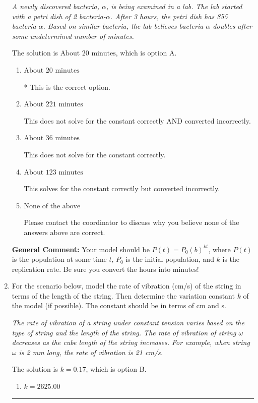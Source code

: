 \documentclass{extbook}[14pt]
\newcommand{\litem}[1]{\item #1

\rule{\textwidth}{0.4pt}}
\begin{document}
\begin{enumerate}
{\begin{center}
    \textit{ A newly discovered bacteria, $\alpha$, is being examined in a lab. The lab started with a petri dish of 2 bacteria-$\alpha$. After 3 hours, the petri dish has 855 bacteria-$\alpha$. Based on similar bacteria, the lab believes bacteria-$\alpha$ doubles after some undetermined number of minutes. }
\end{center}
The solution is \( \text{About } 20 \text{ minutes} \), which is option A.\begin{enumerate}[label=\Alph*.]
\item \( \text{About } 20 \text{ minutes} \)

* This is the correct option.
\item \( \text{About } 221 \text{ minutes} \)

This does not solve for the constant correctly AND converted incorrectly.
\item \( \text{About } 36 \text{ minutes} \)

This does not solve for the constant correctly.
\item \( \text{About } 123 \text{ minutes} \)

This solves for the constant correctly but converted incorrectly.
\item \( \text{None of the above} \)

Please contact the coordinator to discuss why you believe none of the answers above are correct.
\end{enumerate}

\textbf{General Comment:} Your model should be $P(t) = P_0(b)^{kt}$, where $P(t)$ is the population at some time $t$, $P_0$ is the initial population, and $k$ is the replication rate. Be sure you convert the hours into minutes!
}
\litem{
For the scenario below, model the rate of vibration (cm/s) of the string in terms of the length of the string. Then determine the variation constant $k$ of the model (if possible). The constant should be in terms of cm and s.

\begin{center}
    \textit{ The rate of vibration of a string under constant tension varies based on the type of string and the length of the string. The rate of vibration of string $\omega$ decreases as the cube length of the string increases. For example, when string $\omega$ is 2 mm long, the rate of vibration is 21 cm/s. }
\end{center}
The solution is \( k = 0.17 \), which is option B.\begin{enumerate}[label=\Alph*.]
\item \( k = 2625.00 \)


\end{enumerate}}
\end{enumerate}
\end{document}
